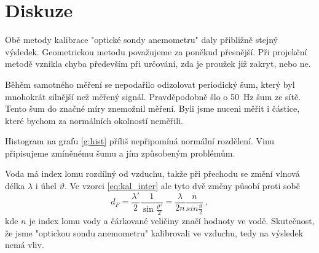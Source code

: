 \section*{Diskuze}
Obě metody kalibrace "optické sondy anemometru" daly přibližně stejný výsledek. Geometrickou metodu považujeme za poněkud přesnější. Při projekční metodě vznikla chyba především při určování, zda je proužek již zakryt, nebo ne.


Běhěm samotného měření se nepodařilo odizolovat periodický šum, který byl mnohokrát silnější než měřený signál. Pravděpodobně šlo o \SI{50}{\Hz} šum ze sítě. Tento šum do značné míry znemožnil měření. Byli jsme nuceni měřit i částice, které bychom za normálních okolností neměřili.


Histogram na grafu \ref{g:hist} příliš nepřipomíná normální rozdělení. Vinu připisujeme zmíněnému šumu a jím způsobeným problémům. 


Voda má index lomu rozdílný od vzduchu, takže při přechodu se změní vlnová délka $\lambda$ i úhel $\vartheta$. Ve vzorci \eqref{eq:kal_inter} ale tyto dvě změny působí proti sobě
\begin{equation*}
d_F=\frac{\lambda\prime}{2} \frac{1}{\sin\frac{\vartheta\prime}{2}}=\frac{\lambda}{2n} \frac{n}{sin\frac{\vartheta}{2}} \,,
\end{equation*}
kde $n$ je index lomu vody a čárkované veličiny značí hodnoty ve vodě. Skutečnost, že jsme "optickou sondu anemometru" kalibrovali ve vzduchu, tedy na výsledek nemá vliv.